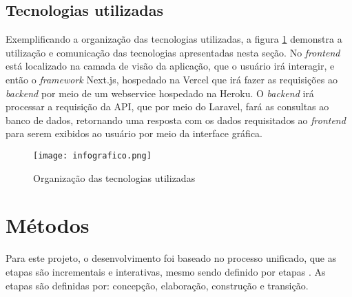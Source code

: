 \subsection{Tecnologias utilizadas}
Exemplificando a organização das tecnologias utilizadas, a figura \ref{info} demonstra a utilização e comunicação das tecnologias apresentadas nesta seção. No \textit{frontend} está localizado na camada de visão da aplicação, que o usuário irá interagir, e então o \textit{framework} Next.js, hospedado na Vercel que irá fazer as requisições ao \textit{backend} por meio de um webservice hospedado na Heroku. O \textit{backend} irá processar a requisição da API, que por meio do Laravel, fará as consultas ao banco de dados, retornando uma resposta com os dados requisitados ao \textit{frontend} para serem exibidos ao usuário por meio da interface gráfica.

\begin{figure}[H]
    \caption{\label{info}Organização das tecnologias utilizadas}
    \vspace{5pt}
    \centering
    \texttt{[image: infografico.png]}
    \vspace{5pt}
\end{figure}


\section{Métodos} \label{metodos}
Para este projeto, o desenvolvimento foi baseado no processo unificado, que as etapas são incrementais e interativas, mesmo sendo definido por etapas \cite{SOMMERVILE}. As etapas são definidas por: concepção, elaboração, construção e transição.



